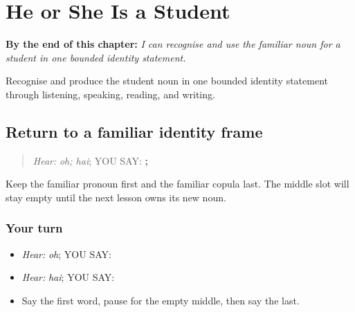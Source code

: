 
\chapter{He or She Is a Student}
\label{ch:pa-a2-vidiarthi}

\begin{chapteropening}
\textbf{By the end of this chapter:} \emph{I can recognise and use the familiar noun for a student in one bounded identity statement.}

Recognise and produce the student noun in one bounded identity statement through listening, speaking, reading, and writing.
\end{chapteropening}

\section[\texorpdfstring{\pa{ਉਹ} · \pa{ਹੈ} (oh; hai)}{ਉਹ · ਹੈ (oh; hai)}]{Return to a familiar identity frame}

\label{lesson:PA-C194-identity-return}



\begin{quote}
\emph{Hear:} \emph{oh; hai}; YOU SAY: \textbf{; }
\end{quote}

\begin{grammarlens}[title={Grammar Lens}]
Keep the familiar pronoun first and the familiar copula last. The middle slot will stay empty until the next lesson owns its new noun.
\end{grammarlens}

\subsection*{Your turn}
\begin{itemize}
\raggedright
  \item \emph{Hear:} \emph{oh}; YOU SAY: \textbf{}
  \item \emph{Hear:} \emph{hai}; YOU SAY: \textbf{}
  \item Say the first word, pause for the empty middle, then say the last.
\end{itemize}

